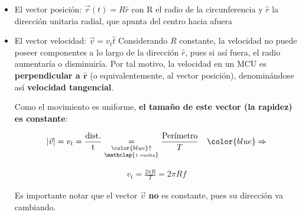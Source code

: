 \documentclass[letterpaper,11pt]{article}
\begin{document}
\begin{itemize}
    \item El vector posición: $\vec{r}(t) = R \hat{r}$
    \newline con R el radio de la circunferencia y $\hat{r}$ la dirección unitaria radial, que apunta del centro hacia afuera

    \item El vector velocidad: $\vec{v} = v_t \hat{t}$
    \newline Considerando $R$ constante, la velocidad no puede poseer componentes a lo largo de la dirección $\hat{r}$, pues si así fuera, el radio aumentaría o disminuiría. Por tal motivo, la velocidad en un MCU es \textbf{perpendicular a $\mathbf{\hat{r}}$} (o equivalentemente, al vector posición), denominándose así \textbf{velocidad tangencial}.

    \newline Como el movimiento es uniforme, \textbf{el tamaño de este vector (la rapidez) es constante}:
    \begin{center}
        \begin{minipage}{0.3\linewidth}
            \begin{align*}
                \left|\vec{v}\right| = v_t = \frac{\text{dist.}}{\text{t}} \underset{\substack{\color{blue}\uparrow \\ \mathclap{\textup{\tiny 1 vuelta}}}} {=} \frac{\text{Perímetro}}{T} \quad \color{blue}\Rightarrow
            \end{align*}
        \end{minipage}
        \hspace{0.5em}
        \begin{minipage}{0.26\linewidth}
            \begin{tcolorbox}[colback=white, colframe=blue, width=1\linewidth]
                \vspace{-1.1em}
                \begin{align*}
                    v_t = \frac{2\pi R }{T} = 2\pi R f
                \end{align*}
            \end{tcolorbox}
        \end{minipage}
    \end{center}

    \newline Es importante notar que el vector $\vec{v}$ \textbf{no} es constante, pues su dirección va cambiando.


\end{itemize}
\end{document}
